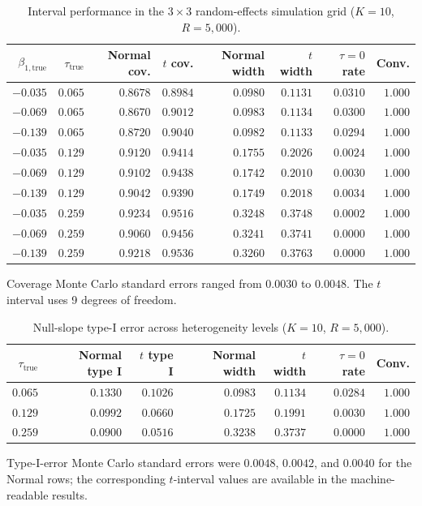 \documentclass[11pt]{article}
\begin{document}
\begin{table}[htbp]
\centering
\caption{Interval performance in the $3\times3$ random-effects simulation grid ($K=10$, $R=5{,}000$).}
\label{tab:supp_random_inference}
\scriptsize
\begin{tabular}{rrrrrrrr}
\toprule
$\beta_{1,\mathrm{true}}$ & $\tau_{\mathrm{true}}$ & Normal cov. & $t$ cov. & Normal width & $t$ width & $\tau=0$ rate & Conv. \\
\midrule
$-0.035$ & $0.065$ & $0.8678$ & $0.8984$ & $0.0980$ & $0.1131$ & $0.0310$ & $1.000$ \\
$-0.069$ & $0.065$ & $0.8670$ & $0.9012$ & $0.0983$ & $0.1134$ & $0.0300$ & $1.000$ \\
$-0.139$ & $0.065$ & $0.8720$ & $0.9040$ & $0.0982$ & $0.1133$ & $0.0294$ & $1.000$ \\
$-0.035$ & $0.129$ & $0.9120$ & $0.9414$ & $0.1755$ & $0.2026$ & $0.0024$ & $1.000$ \\
$-0.069$ & $0.129$ & $0.9102$ & $0.9438$ & $0.1742$ & $0.2010$ & $0.0030$ & $1.000$ \\
$-0.139$ & $0.129$ & $0.9042$ & $0.9390$ & $0.1749$ & $0.2018$ & $0.0034$ & $1.000$ \\
$-0.035$ & $0.259$ & $0.9234$ & $0.9516$ & $0.3248$ & $0.3748$ & $0.0002$ & $1.000$ \\
$-0.069$ & $0.259$ & $0.9060$ & $0.9456$ & $0.3241$ & $0.3741$ & $0.0000$ & $1.000$ \\
$-0.139$ & $0.259$ & $0.9218$ & $0.9536$ & $0.3260$ & $0.3763$ & $0.0000$ & $1.000$ \\
\bottomrule
\end{tabular}
\par\smallskip
{\footnotesize Coverage Monte Carlo standard errors ranged from $0.0030$ to $0.0048$. The $t$ interval uses 9 degrees of freedom.}
\end{table}

\begin{table}[htbp]
\centering
\caption{Null-slope type-I error across heterogeneity levels ($K=10$, $R=5{,}000$).}
\label{tab:supp_null_inference}
\small
\begin{tabular}{rrrrrrr}
\toprule
$\tau_{\mathrm{true}}$ & Normal type I & $t$ type I & Normal width & $t$ width & $\tau=0$ rate & Conv. \\
\midrule
$0.065$ & $0.1330$ & $0.1026$ & $0.0983$ & $0.1134$ & $0.0284$ & $1.000$ \\
$0.129$ & $0.0992$ & $0.0660$ & $0.1725$ & $0.1991$ & $0.0030$ & $1.000$ \\
$0.259$ & $0.0900$ & $0.0516$ & $0.3238$ & $0.3737$ & $0.0000$ & $1.000$ \\
\bottomrule
\end{tabular}
\par\smallskip
{\footnotesize Type-I-error Monte Carlo standard errors were $0.0048$, $0.0042$, and $0.0040$ for the Normal rows; the corresponding $t$-interval values are available in the machine-readable results.}
\end{table}
\end{document}
